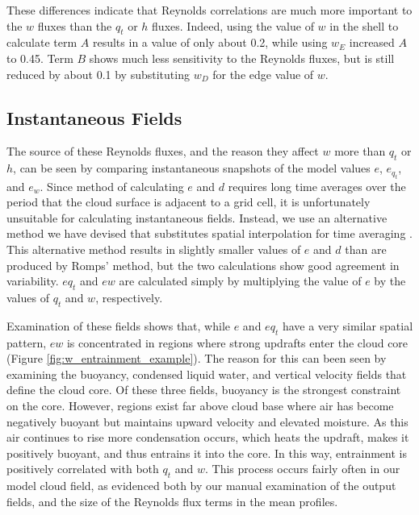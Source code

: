 \documentclass[12pt]{article}
\begin{document}
These differences indicate that Reynolds correlations are much more important 
to the $w$ fluxes than the $q_t$ or $h$ fluxes.  Indeed, using the value 
of $w$ in the shell to calculate term $A$ results in a value of only about 0.2, 
while using $w_E$ increased $A$ to 0.45.  Term $B$ shows much less sensitivity 
to the Reynolds fluxes, but is still reduced by about 0.1 by substituting $w_D$ 
for the edge value of $w$.


\subsection{Instantaneous Fields}

The source of these Reynolds fluxes, and the reason they affect $w$ more than 
$q_t$ or $h$, can be seen by comparing instantaneous snapshots of the model 
values $e$, $e_{q_t}$, and $e_w$.  Since \cite{Romps2010} method of calculating 
$e$ and $d$ requires long time averages over the period that the cloud surface
is adjacent to a grid cell, it is unfortunately unsuitable for calculating 
instantaneous fields.  Instead, we use an alternative method we have devised 
that substitutes spatial interpolation for time averaging \citep{Dawe2011}.  
This alternative method results in slightly smaller values of $e$ and $d$ than 
are produced by Romps' method, but the two calculations show good agreement in 
variability. $eq_t$ and $ew$ are calculated simply by multiplying the value 
of $e$ by the values of $q_t$ and $w$, respectively.

Examination of these fields shows that, while $e$ and $eq_t$ have a very 
similar spatial pattern, $ew$ is concentrated in regions where strong updrafts 
enter the cloud core (Figure \ref{fig:w_entrainment_example}).  The reason for 
this can been seen by examining the buoyancy, condensed liquid water,
and vertical velocity fields that define the cloud core.  Of these three
fields, buoyancy is the strongest constraint on the core.  However, regions 
exist far above cloud base where air has become negatively buoyant but 
maintains upward velocity and elevated moisture.  As this air continues to 
rise more condensation occurs, which heats the updraft, makes it positively 
buoyant, and thus entrains it into the core.  In this way, entrainment is 
positively correlated with both $q_t$ and $w$.  This process occurs fairly 
often in our model cloud field, as evidenced both by our manual examination of 
the output fields, and the size of the Reynolds flux terms in the mean 
profiles.
\end{document}
